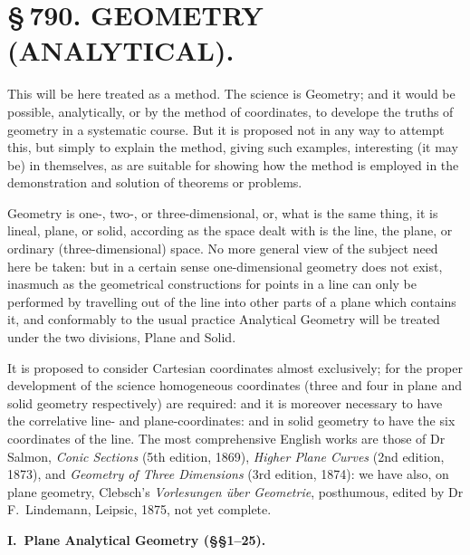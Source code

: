 \documentclass[11pt,a4paper]{book}
\begin{document}
\newpage
\section*{\S\,790. GEOMETRY (ANALYTICAL).}


\smallskip

This will be here treated as a method. The science is Geometry; and it would be possible, analytically, or by the method of coordinates, to develope the truths of geometry in a systematic course. But it is proposed not in any way to attempt this, but simply to explain the method, giving such examples, interesting (it may be) in themselves, as are suitable for showing how the method is employed in the demonstration and solution of theorems or problems.

Geometry is one-, two-, or three-dimensional, or, what is the same thing, it is lineal, plane, or solid, according as the space dealt with is the line, the plane, or ordinary (three-dimensional) space. No more general view of the subject need here be taken: but in a certain sense one-dimensional geometry does not exist, inasmuch as the geometrical constructions for points in a line can only be performed by travelling out of the line into other parts of a plane which contains it, and conformably to the usual practice Analytical Geometry will be treated under the two divisions, Plane and Solid.

It is proposed to consider Cartesian coordinates almost exclusively; for the proper development of the science homogeneous coordinates (three and four in plane and solid geometry respectively) are required: and it is moreover necessary to have the correlative line- and plane-coordinates: and in solid geometry to have the six coordinates of the line. The most comprehensive English works are those of Dr Salmon, \textit{Conic Sections} (5th edition, 1869), \textit{Higher Plane Curves} (2nd edition, 1873), and \textit{Geometry of Three Dimensions} (3rd edition, 1874): we have also, on plane geometry, Clebsch's \textit{Vorlesungen \"{u}ber Geometrie}, posthumous, edited by Dr F.\ Lindemann, Leipsic, 1875, not yet complete.

\smallskip
\begin{center}\textbf{I.\ Plane Analytical Geometry (\S\S 1--25).}\end{center}
\end{document}

